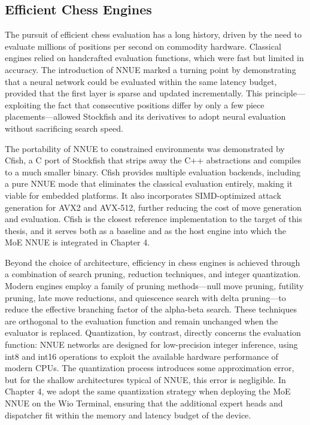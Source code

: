 \subsection{Efficient Chess Engines}

The pursuit of efficient chess evaluation has a long history, driven by the need to evaluate millions of positions per second on commodity hardware. Classical engines relied on handcrafted evaluation functions, which were fast but limited in accuracy. The introduction of NNUE marked a turning point by demonstrating that a neural network could be evaluated within the same latency budget, provided that the first layer is sparse and updated incrementally. This principle---exploiting the fact that consecutive positions differ by only a few piece placements---allowed Stockfish and its derivatives to adopt neural evaluation without sacrificing search speed.

The portability of NNUE to constrained environments was demonstrated by Cfish, a C port of Stockfish that strips away the C++ abstractions and compiles to a much smaller binary. Cfish provides multiple evaluation backends, including a pure NNUE mode that eliminates the classical evaluation entirely, making it viable for embedded platforms. It also incorporates SIMD-optimized attack generation for AVX2 and AVX-512, further reducing the cost of move generation and evaluation. Cfish is the closest reference implementation to the target of this thesis, and it serves both as a baseline and as the host engine into which the MoE NNUE is integrated in Chapter 4.


Beyond the choice of architecture, efficiency in chess engines is achieved through a combination of search pruning, reduction techniques, and integer quantization. Modern engines employ a family of pruning methods---null move pruning, futility pruning, late move reductions, and quiescence search with delta pruning---to reduce the effective branching factor of the alpha-beta search. These techniques are orthogonal to the evaluation function and remain unchanged when the evaluator is replaced. Quantization, by contrast, directly concerns the evaluation function: NNUE networks are designed for low-precision integer inference, using int8 and int16 operations to exploit the available hardware performance of modern CPUs. The quantization process introduces some approximation error, but for the shallow architectures typical of NNUE, this error is negligible. In Chapter 4, we adopt the same quantization strategy when deploying the MoE NNUE on the Wio Terminal, ensuring that the additional expert heads and dispatcher fit within the memory and latency budget of the device.

